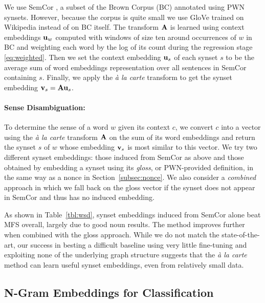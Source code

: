\documentclass[11pt,a4paper]{article}
\begin{document}
We use SemCor \cite{Langone:04}, a subset of the Brown Corpus (BC) \cite{Francis:79} annotated using PWN synsets.
However, because the corpus is quite small we use GloVe trained on Wikipedia instead of on BC itself.
The transform ${\bf A}$ is learned using context embeddings ${\bf u}_w$ computed with windows of size ten around occurrences of $w$ in BC and weighting each word by the log of its count during the regression stage \eqref{eq:weighted}.
Then we set the context embedding ${\bf u}_s$ of each synset $s$ to be the average sum of word embeddings representation over all sentences in SemCor containing $s$.
Finally, we apply the {\em\` a la carte} transform to get the synset embedding ${\bf v}_s={\bf Au}_s$.

\paragraph{Sense Disambiguation:}
To determine the sense of a word $w$ given its context $c$, we convert $c$ into a vector using the {\em\`a la carte} transform ${\bf A}$ on the sum of its word embeddings and return the synset $s$ of $w$ whose embedding ${\bf v}_s$ is most similar to this vector.
We try two different synset embeddings: those induced from SemCor as above and those obtained by embedding a synset using its {\em gloss}, or PWN-provided definition, in the same way as a nonce in Section~\ref{subsec:nonce}.
We also consider a {\em combined} approach in which we fall back on the gloss vector if the synset does not appear in SemCor and thus has no induced embedding.

As shown in Table~\ref{tbl:wsd}, synset embeddings induced from SemCor alone beat MFS overall, largely due to good noun results.
The method improves further when combined with the gloss approach.
While we do not match the state-of-the-art, our success in besting a difficult baseline using very little fine-tuning and exploiting none of the underlying graph structure suggests that the {\em\`a la carte} method can learn useful synset embeddings, even from relatively small data.

\subsection{N-Gram Embeddings for Classification}
\end{document}
